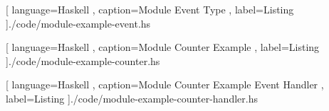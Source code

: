 \begin{center}
  
    [ language=Haskell
    , caption={Module Event Type}
    , label=Listing
    ]{./code/module-example-event.hs}
\end{center}

\begin{center}
  
    [ language=Haskell
    , caption={Module Counter Example}
    , label=Listing
    ]{./code/module-example-counter.hs}
\end{center}

\begin{center}
  
    [ language=Haskell
    , caption={Module Counter Example Event Handler}
    , label=Listing
    ]{./code/module-example-counter-handler.hs}
\end{center}
